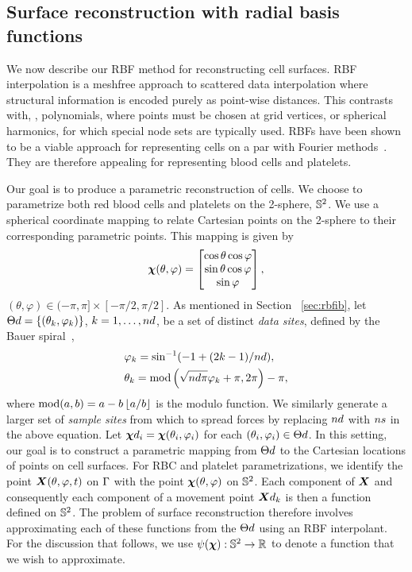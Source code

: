 \subsection{Surface reconstruction with radial basis functions}\label{sec:rbf-interpolation}

We now describe our RBF method for reconstructing cell surfaces. RBF interpolation is a meshfree approach to
scattered data interpolation where structural information is encoded purely as point-wise distances. This
contrasts with, , polynomials, where points must be chosen at grid vertices, or spherical harmonics,
for which special node sets are typically used. RBFs have been shown to be a viable approach for representing
cells on a par with Fourier methods~\cite{Shankar:2013ki}. They are therefore appealing for representing blood
cells and platelets.

Our goal is to produce a parametric reconstruction of cells. We choose to parametrize both red blood cells and
platelets on the 2-sphere, $\mathbb{S}^2$. We use a spherical coordinate mapping to relate Cartesian points on the
2-sphere to their corresponding parametric points. This mapping is given by
\begin{equation}
    \boldsymbol{\chi}(\theta, \varphi) =
    \begin{bmatrix}
        \cos\theta\cos\varphi \\
        \sin\theta\cos\varphi \\
        \sin\varphi
    \end{bmatrix},
\end{equation}
$(\theta, \varphi)\in(-\pi, \pi]\times[-\pi/2, \pi/2]$. As mentioned in Section~%
\ref{sec:rbfib}, let $\data\sites = \{(\theta_k, \varphi_k)\}$,
$k=1, \ldots, \data\cardinality$, be a set of distinct \emph{data sites}, defined by the
Bauer spiral~\cite{Bauer:2000km},
\begin{equation}\label{eq:bauer-spiral}
    \begin{aligned}
        &\varphi_k = \sin^{-1}(-1 + (2k - 1) / \data\cardinality),\\
        &\theta_k = \modulo\left(\sqrt{\data\cardinality\pi}\varphi_k + \pi, 2\pi\right) - \pi,
    \end{aligned}
\end{equation}
where $\operatorname{mod}(a, b) = a - b\left\lfloor{a/b}\right\rfloor$ is the modulo function. We similarly generate a larger set of
\emph{sample sites} from which to spread forces by replacing $\data\cardinality$ with $\sample\cardinality$ in the
above equation. Let $\data\Xp_i=\Xp(\theta_i, \varphi_i)$ for each $(\theta_i, \varphi_i)\in\data\sites$. In this
setting, our goal is to construct a parametric mapping from $\data\sites$ to the Cartesian locations of points on
cell surfaces. For RBC and platelet parametrizations, we identify the point $\boldsymbol{X}(\theta, \varphi, t)$ on
$\Gamma$ with the point $\boldsymbol{\chi}(\theta, \varphi)$ on $\mathbb{S}^2$. Each component of $\boldsymbol{X}$ and consequently each
component of a movement point $\data\X_k$ is then a function defined on $\mathbb{S}^2$. The problem of surface
reconstruction therefore involves approximating each of these functions from the $\data\sites$ using an RBF
interpolant. For the discussion that follows, we use $\psi(\boldsymbol{\chi}):\mathbb{S}^2\to\mathbb{R}$ to denote a function that we wish to
approximate.

